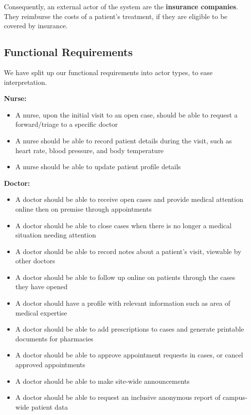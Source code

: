 \documentclass[a4paper, 12pt, titlepage]{article}
\begin{document}
  Consequently, an external actor of the system are the \textbf{insurance companies}.
  They reimburse the costs of a patient's treatment, if they are eligible to be covered by insurance.

  \pagebreak
  \subsection{Functional Requirements}

  We have split up our functional requirements into actor types, to ease interpretation.

  \textbf{Nurse:}
  \begin{itemize}
    \item A nurse, upon the initial visit to an open case, should be able to request a forward/triage to a specific doctor
    \item A nurse should be able to record patient details during the visit, such as heart rate, blood pressure, and body temperature
    \item A nurse should be able to update patient profile details
  \end{itemize}

  \textbf{Doctor:}
  \begin{itemize}
    \item A doctor should be able to receive open cases and provide medical attention online then on premise through appointments
    \item A doctor should be able to close cases when there is no longer a medical situation needing attention
    \item A doctor should be able to record notes about a patient's visit, viewable by other doctors
    \item A doctor should be able to follow up online on patients through the cases they have opened
    \item A doctor should have a profile with relevant information such as area of medical expertise
    \item A doctor should be able to add prescriptions to cases and generate printable documents for pharmacies
    \item A doctor should be able to approve appointment requests in cases, or cancel approved appointments
    \item A doctor should be able to make site-wide announcements
    \item A doctor should be able to request an inclusive anonymous report of campus-wide patient data
  \end{itemize}
\end{document}
